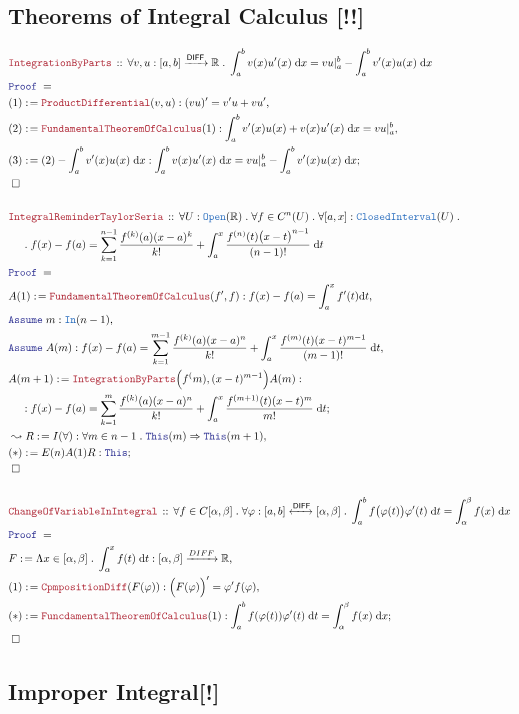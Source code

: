 \documentclass[12pt]{scrartcl}
\newcommand{\TYPE}[1]{\textcolor{NavyBlue}{\mathtt{#1}}}
\newcommand{\LOGIC}[1]{\textcolor{Blue}{\mathtt{#1}}}
\newcommand{\THM}[1]{\textcolor{Maroon}{\mathtt{#1}}}
\renewcommand{\.}{\; . \;}
\newcommand{\de}{: \kern 0.1pc =}
\newcommand{\Theorem}[2]{& \THM{#1} \, :: \, #2 \\ & \Proof = \\ }
\newcommand{\NewLine}{\\ & \kern 1pc}
\newcommand{\Page}[1]{ \begin{align*} #1 \end{align*}   }
\newcommand{\Reals}{\mathbb{R} }
\newcommand{\Say}[3]{& #1 \de #2 : #3, \\}
\newcommand{\Conclude}[3]{& #1 \de #2 : #3; \\}
\newcommand{\Derive}[3]{& \leadsto #1 \de #2 : #3, \\}
\newcommand{\Assume}[2]{& \LOGIC{Assume} \;#1 : #2, \\}
\newcommand{\QED}{\; \square}
\newcommand{\EndProof}{& \QED \\}
\newcommand{\Proof}{\LOGIC{Proof} \; }
\begin{document}
\subsection{Theorems of Integral Calculus [!!]}
\Page{
	\Theorem{IntegrationByParts}{
		\forall v,u : [a,b] \xrightarrow{ \mathsf{DIFF} } \Reals \. 
		\int^b_a v(x)u'(x) \; \mathrm{d}x = vu|^b_a - \int^b_a v'(x)u(x) \; \mathrm{d}x
	}
	\Say{(1)}{ \THM{ProductDifferential}(v,u)  }{ (vu)' = v'u + vu'}
	\Say{(2)}{\THM{FundamentalTheoremOfCalculus}(1)}{ 
		\int^b_a v'(x)u(x) + v(x)u'(x) \; \mathrm{d}x  =  vu |^b_a  
		}
	\Conclude{(3)}{  (2) - \int^b_a v'(x)u(x) \; \mathrm{d}x  }
	{  \int^b_a v(x)u'(x)  \; \mathrm{d}x = vu|^b_a - \int^b_a v'(x)u(x) \; \mathrm{d}x   }
	\EndProof
	\\
	\Theorem{IntegralReminderTaylorSeria}{\forall U : \TYPE{Open}(\Reals) \. \forall f \in C^n(U)
		\. \forall [a,x] : \TYPE{ClosedInterval}(U) \. \NewLine \.
		f(x) - f(a) = \sum^{n-1}_{k=1} \frac{f^{(k)}(a)(x -a)^k}{k!} + 
		\int^x_a \frac{f^{(n)}(t)\big( x - t \big)^{n-1}}{(n-1)!} \; \mathrm{d} t
	}
	\Say{A(1)}{\THM{FundamentalTheoremOfCalculus}(f',f)}
	{ f(x) - f(a) = \int^x_a f'(t)\mathrm{d}t  }
	\Assume{m}{\TYPE{In}(n-1)}
	\Assume{A(m)}{f(x) - f(a) = \sum^{m-1}_{k=1} \frac{f^{(k)}(a)(x-a)^n}{k!}    
		+ \int^x_a \frac{f^{(m)}(t)(x-t)^{m-1}}{(m-1)!} \; \mathrm{d} t
	}
	\Conclude{A(m+1)}{\THM{IntegrationByParts}\Big( f^(m),(x-t)^{m-1}\Big)A(m)}
	{
		\NewLine :
		f(x) - f(a) = \sum^{m}_{k=1} \frac{f^{(k)}(a)(x-a)^n}{k!}    
		    + \int^x_a \frac{f^{(m + 1)}(t)(x-t)^{m}}{m!} \; \mathrm{d} t
	}
	\Derive{R}{I(\forall)}{\forall m \in n-1 \. \LOGIC{This}(m) \Rightarrow \LOGIC{This}(m+1)}
	\Conclude{(*)}{E(n)A(1)R}{\LOGIC{This}}
	\EndProof
	\\
	\Theorem{ChangeOfVariableInIntegral}{\forall f \in C[\alpha,\beta] \. \forall \varphi : [a,b] 
		\xleftrightarrow{\mathsf{DIFF}} [\alpha,\beta] \.   
		 \int^b_a f\big(\varphi(t)\big)\varphi'(t) \; \mathrm{d}t =
		 \int^\beta_\alpha f(x)  \; \mathrm{d}x
		}
	\Say{F}{\Lambda x \in [\alpha,\beta] \. \int^x_\alpha f(t) \; \mathrm{d}t}
	{[\alpha,\beta] \xrightarrow{DIFF} \Reals}
	\Say{(1)}{\THM{CpmpositionDiff}(F(\varphi))}{\Big(F(\varphi)\Big)' =\varphi' f(\varphi)}
	\Conclude{(*)}{\THM{FuncdamentalTheoremOfCalculus}(1)}{
		\int^b_a f(\varphi(t)) \varphi'(t) \; \mathrm{d}t = 
		   \int^\beta_\alpha f(x) \; \mathrm{d}x
		}
	\EndProof
}
\newpage
\subsection{Improper Integral[!]}
\Page{
}
\newpage
\end{document}
